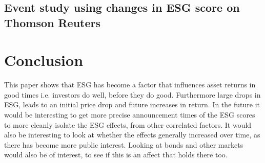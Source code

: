 \documentclass[11pt]{article}
\begin{document}
\subsection{Event study using changes in ESG score on Thomson Reuters}



\section{Conclusion}
This paper shows that ESG has become a factor that influences asset returns in good times i.e. investors do well, before they do good. Furthermore large drops in ESG, leads to an initial price drop and future increases in return. In the future it would be interesting to get more precise announcement times of the ESG scores to more cleanly isolate the ESG effects, from other correlated factors. It would also be interesting to look at whether the effects generally increased over time, as there has become more public interest. Looking at bonds and other markets would also be of interest, to see if this is an affect that holds there too.


\clearpage


%
\end{document}
